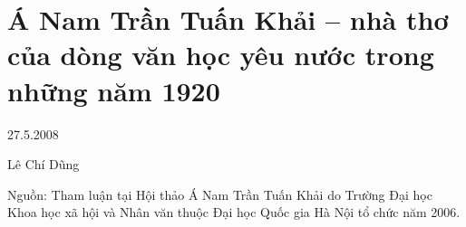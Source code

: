 \documentclass[../main.tex]{subfiles}
\begin{document}
\chapter{Á Nam Trần Tuấn Khải – nhà thơ của dòng văn học yêu nước trong những năm 1920}

\begin{metadata}

\begin{flushright}27.5.2008\end{flushright}

Lê Chí Dũng

Nguồn: Tham luận tại Hội thảo Á Nam Trần Tuấn Khải do Trường Đại học Khoa học xã hội và Nhân văn thuộc Đại học Quốc gia Hà Nội tổ chức năm 2006.

\end{metadata}
\end{document}
